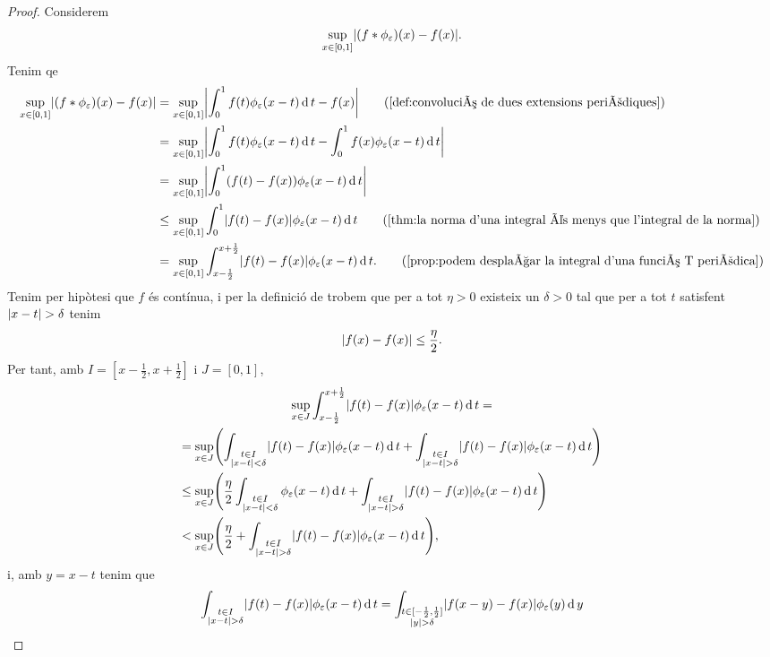 \documentclass[../../Main.tex]{subfiles}
\begin{document}
\begin{theorem}
\begin{proof}
			Considerem
			\[\sup_{x\in[0,1]}\abs{(f\convolucio\phi_{\varepsilon})(x)-f(x)}.\]
			Tenim qe
			\begin{align*}
				\sup_{x\in[0,1]}\abs{(f\convolucio\phi_{\varepsilon})(x)-f(x)}&=\sup_{x\in[0,1]}\abs{\int_{0}^{1}f(t)\phi_{\varepsilon}(x-t)\diff t-f(x)} \tag{\ref{def:convolució de dues extensions periòdiques}} \\
				&=\sup_{x\in[0,1]}\abs{\int_{0}^{1}f(t)\phi_{\varepsilon}(x-t)\diff t-\int_{0}^{1}f(x)\phi_{\varepsilon}(x-t)\diff t} \\
				&=\sup_{x\in[0,1]}\abs{\int_{0}^{1}(f(t)-f(x))\phi_{\varepsilon}(x-t)\diff t} \\
				&\leq\sup_{x\in[0,1]}\int_{0}^{1}\abs{f(t)-f(x)}\phi_{\varepsilon}(x-t)\diff t \tag{\ref{thm:la norma d'una integral és menys que l'integral de la norma}} \\
				&=\sup_{x\in[0,1]}\int_{x-\frac{1}{2}}^{x+\frac{1}{2}}\abs{f(t)-f(x)}\phi_{\varepsilon}(x-t)\diff t. \tag{\ref{prop:podem desplaçar la integral d'una funció T periòdica}}
			\end{align*}
			 Tenim per hipòtesi que \(f\) és contínua, i per la definició de  trobem que per a tot \(\eta>0\) existeix un \(\delta>0\) tal que per a tot \(t\) satisfent \(\abs{x-t}>\delta\) tenim
			 \[\abs{f(x)-f(x)}\leq\frac{\eta}{2}.\]
			 Per tant, amb \(I=[x-\frac{1}{2},x+\frac{1}{2}]\) i \(J=[0,1]\), %
			 \begin{multline*}
				 \sup_{x\in J}\int_{x-\frac{1}{2}}^{x+\frac{1}{2}}\abs{f(t)-f(x)}\phi_{\varepsilon}(x-t)\diff t = \\
				 =\sup_{x\in J}\left(\int_{\substack{t\in I\\\abs{x-t}<\delta}}\abs{f(t)-f(x)}\phi_{\varepsilon}(x-t)\diff t+\int_{\substack{t\in I\\\abs{x-t}>\delta}}\abs{f(t)-f(x)}\phi_{\varepsilon}(x-t)\diff t\right) \hfill\\
				 \leq\sup_{x\in J}\left(\frac{\eta}{2}\int_{\substack{t\in I\\\abs{x-t}<\delta}}\phi_{\varepsilon}(x-t)\diff t+\int_{\substack{t\in I\\\abs{x-t}>\delta}}\abs{f(t)-f(x)}\phi_{\varepsilon}(x-t)\diff t\right) \hfill\\
				 <\sup_{x\in J}\left(\frac{\eta}{2}+\int_{\substack{t\in I\\\abs{x-t}>\delta}}\abs{f(t)-f(x)}\phi_{\varepsilon}(x-t)\diff t\right), \hfill
			 \end{multline*}
			 i, amb \(y=x-t\) tenim que %
			 \[\int_{\substack{t\in I\\\abs{x-t}>\delta}}\abs{f(t)-f(x)}\phi_{\varepsilon}(x-t)\diff t=\int_{\substack{t\in[-\frac{1}{2},\frac{1}{2}]\\\abs{y}>\delta}}\abs{f(x-y)-f(x)}\phi_{\varepsilon}(y)\diff y\]
		\end{proof}
	\end{theorem}
\end{document}

